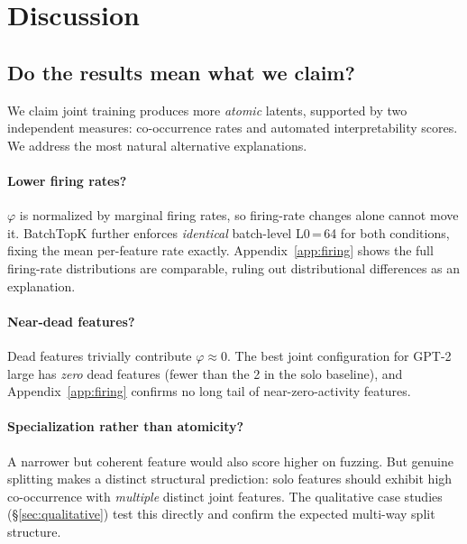 \documentclass{article} %
\begin{document}
\section{Discussion}
\label{sec:discussion}

\subsection{Do the results mean what we claim?}
\label{sec:alternative}

We claim joint training produces more \emph{atomic} latents, supported by two
independent measures: co-occurrence rates and automated interpretability scores.
We address the most natural alternative explanations.

\paragraph{Lower firing rates?}
$\varphi$ is normalized by marginal firing rates, so firing-rate changes alone
cannot move it.
BatchTopK further enforces \emph{identical} batch-level L0\,=\,64 for both
conditions, fixing the mean per-feature rate exactly.
Appendix~\ref{app:firing} shows the full firing-rate distributions are
comparable, ruling out distributional differences as an explanation.

\paragraph{Near-dead features?}
Dead features trivially contribute $\varphi\!\approx\!0$.
The best joint configuration for GPT-2 large has \emph{zero} dead features (fewer than the 2
in the solo baseline), and Appendix~\ref{app:firing} confirms no long tail of
near-zero-activity features.

\paragraph{Specialization rather than atomicity?}
A narrower but coherent feature would also score higher on fuzzing. But genuine
splitting makes a distinct structural prediction: solo features should exhibit
high co-occurrence with \emph{multiple} distinct joint features.
The qualitative case studies (\S\ref{sec:qualitative}) test this directly and
confirm the expected multi-way split structure.
\end{document}
